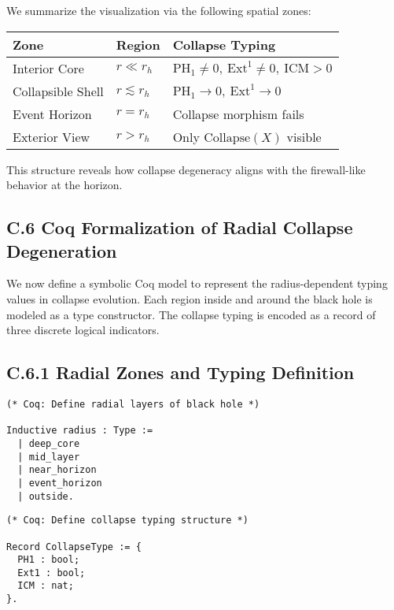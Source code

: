 \documentclass[11pt]{article}
\begin{document}
We summarize the visualization via the following spatial zones:

\begin{center}
\begin{tabular}{lll}
\toprule
\textbf{Zone} & \textbf{Region} & \textbf{Collapse Typing} \\
\midrule
Interior Core & \( r \ll r_h \) & \( \mathrm{PH}_1 \neq 0,\ \mathrm{Ext}^1 \neq 0,\ \mathrm{ICM} > 0 \) \\
Collapsible Shell & \( r \lesssim r_h \) & \( \mathrm{PH}_1 \to 0,\ \mathrm{Ext}^1 \to 0 \) \\
Event Horizon & \( r = r_h \) & Collapse morphism fails \\
Exterior View & \( r > r_h \) & Only \( \mathrm{Collapse}(X) \) visible \\
\bottomrule
\end{tabular}
\end{center}

This structure reveals how collapse degeneracy aligns with the firewall-like behavior at the horizon.

\subsection*{C.6 Coq Formalization of Radial Collapse Degeneration}

We now define a symbolic Coq model to represent the radius-dependent typing values in collapse evolution. Each region inside and around the black hole is modeled as a type constructor. The collapse typing is encoded as a record of three discrete logical indicators.

\subsection*{C.6.1 Radial Zones and Typing Definition}

\begin{lstlisting}
(* Coq: Define radial layers of black hole *)

Inductive radius : Type :=
  | deep_core
  | mid_layer
  | near_horizon
  | event_horizon
  | outside.
\end{lstlisting}

\begin{lstlisting}
(* Coq: Define collapse typing structure *)

Record CollapseType := {
  PH1 : bool;
  Ext1 : bool;
  ICM : nat;
}.
\end{lstlisting}
\end{document}
